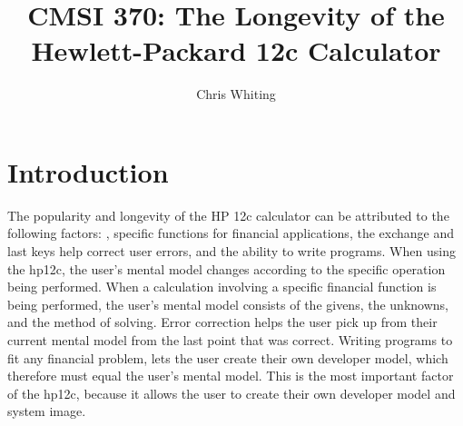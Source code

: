 \documentclass{article}
\title{CMSI 370: The Longevity of the Hewlett-Packard 12c Calculator}
\author{Chris Whiting}
\date{}
\begin{document}
\maketitle


\pagebreak
\tableofcontents

\pagebreak
\listoffigures

\pagebreak
\listoftables

\pagebreak

%
%
\section{Introduction}
\label{introduction}

The popularity and longevity of the HP 12c calculator can be attributed to the following factors: , specific functions for financial applications, the exchange and last keys help correct user errors, and the ability to write programs. When using the hp12c, the user's mental model changes according to the specific operation being performed. When a calculation involving a specific financial function is being performed, the user's mental model consists of the givens, the unknowns, and the method of solving. Error correction helps the user pick up from their current mental model from the last point that was correct. Writing programs to fit any financial problem, lets the user create their own developer model, which therefore must equal the user's mental model. This is the most important factor of the hp12c, because it allows the user to create their own developer model and system image.
\end{document}
